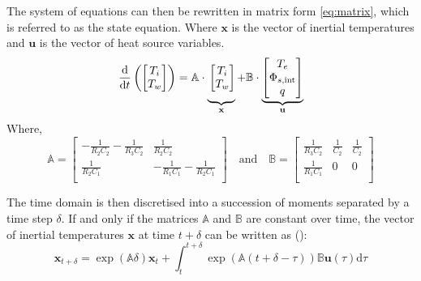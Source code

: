 \documentclass[11pt]{article}
\begin{document}
        The system of equations can then be rewritten in matrix form \eqref{eq:matrix}, which is referred to as the state equation. Where $\mathbf{x}$ is the vector of inertial temperatures and $\mathbf{u}$ is the vector of heat source variables. 
        \begin{equation}\label{eq:matrix}
          \frac{\mathrm{d}}{\mathrm{d}t}\left(\begin{bmatrix}
            T_i\\
            T_w
          \end{bmatrix}\right) = \mathbb{A} \cdot \underbrace{\vphantom{\begin{bmatrix}
            T_e\\
            \Phi_{s,\mathrm{int}}\\
            q
          \end{bmatrix}}\begin{bmatrix}
            T_i\\
            T_w
          \end{bmatrix}}_{\mathbf{x}} + \mathbb{B}\cdot\underbrace{\begin{bmatrix}
            T_e\\
            \Phi_{s,\mathrm{int}}\\
            q
          \end{bmatrix}}_{\mathbf{u}}
        \end{equation}
        \noindent
        Where,
        $$
        \mathbb{A}  = \begin{bmatrix}
            -\frac{1}{R_2 C_2} - \frac{1}{R_3 C_2} & \frac{1}{R_2 C_2}\\
            \frac{1}{R_2 C_1} & -\frac{1}{R_1 C_1} - \frac{1}{R_2 C_1}\\
          \end{bmatrix}
        \quad\text{and}\quad
        \mathbb{B}  = \begin{bmatrix}
            \frac{1}{R_3 C_2} & \frac{1}{C_2} & \frac{1}{C_2}\\
            \frac{1}{R_1 C_1}  & 0 & 0\\
          \end{bmatrix}
        $$

        The time domain is then discretised into a succession of moments separated by a time step $\delta$. If and only if the matrices $\mathbb{A}$ and $\mathbb{B}$ are constant over time, the vector of inertial temperatures $\mathbf{x}$ at time $t+\delta$ can be written as (\cite{brogan_modern_1991}):
        \begin{equation}\label{eq:xtdelta}
            \mathbf{x}_{t+\delta} = \exp\left(\mathbb{A}\delta\right)\mathbf{x}_{t} + \int_t^{t+\delta} \exp\left(\mathbb{A}(t+\delta-\tau)\right) \mathbb{B}\mathbf{u}(\tau)\mathrm{d}\tau
        \end{equation}
        
\end{document}
